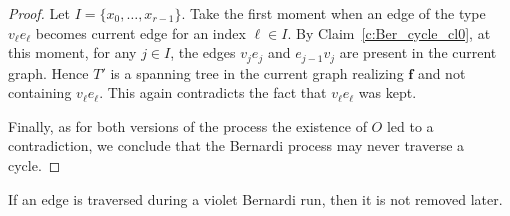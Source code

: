 \documentclass[ALCO,ThmDefs,Unicode,epreuves]{cedram}
\begin{document}
\begin{proof}
Let $I=\{x_0,\dots,x_{r-1}\}$. Take the first moment when an edge of the type $v_\ell e_\ell$ becomes current edge for an index $\ell\in I$. By Claim~\ref{c:Ber_cycle_cl0}, at this moment, for any $j\in I$, the edges $v_j e_j$ and $e_{j-1} v_{j}$ are present in the current graph. Hence $T'$ is a spanning tree in the current graph realizing $\mathbf f$ and not containing $v_\ell e_\ell$. This again contradicts the fact that $v_\ell e_\ell$ was kept.

Finally, as for both versions of the process the existence of $O$ led to a contradiction, we conclude that the Bernardi process may never traverse a cycle.
\end{proof}

\begin{lemma}\label{l:traversed_edge_is_not_deleted}
If an edge is traversed during a violet Bernardi run, then it is not removed later.
\end{lemma}
\end{document}
